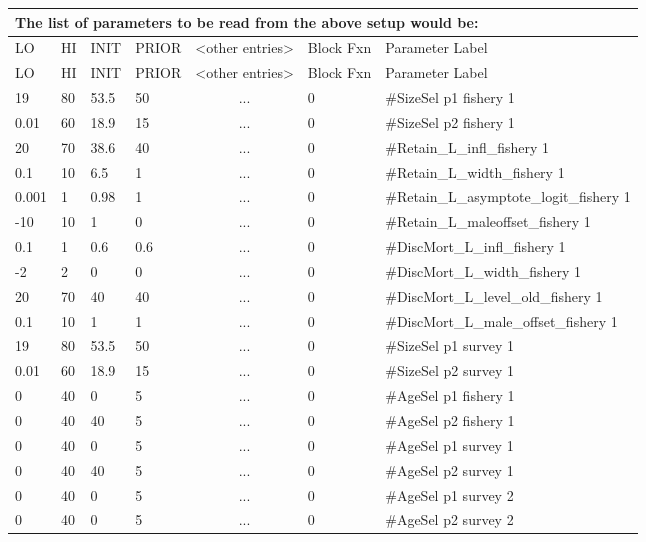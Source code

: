 \begin{longtable}{p{1cm} p{1cm} p{1cm} p{1.5cm} p{2.9cm} p{1.9cm} p{4.2cm}}
	\multicolumn{7}{l}{The list of parameters to be read from the above setup would be:} \\
	\hline
	LO \Tstrut & HI & INIT & PRIOR & <other entries> & Block Fxn & Parameter Label \Bstrut\\
	\hline
	\endfirsthead

	\hline
	LO \Tstrut & HI & INIT & PRIOR & <other entries> & Block Fxn & Parameter Label \Bstrut\\
	\hline
	\endhead
		
	19    & 80   & 53.5 & 50  & \multicolumn{1}{c}{...}  & 0   & \#SizeSel p1 fishery 1 \Tstrut\\
	0.01  & 60   & 18.9 & 15  & \multicolumn{1}{c}{...}  & 0   & \#SizeSel p2 fishery 1 \\
	20    & 70   & 38.6 & 40  & \multicolumn{1}{c}{...}  & 0   & \#Retain\_L\_infl\_fishery 1 \\
	0.1   & 10   & 6.5  & 1   & \multicolumn{1}{c}{...}  & 0   & \#Retain\_L\_width\_fishery 1 \\
	0.001 & 1    & 0.98 & 1   & \multicolumn{1}{c}{...}  & 0   & \#Retain\_L\_asymptote\_logit\_fishery 1 \\
	-10   & 10   & 1    & 0   & \multicolumn{1}{c}{...}  & 0   & \#Retain\_L\_maleoffset\_fishery 1 \\
	0.1   & 1    & 0.6  & 0.6 & \multicolumn{1}{c}{...}  & 0   & \#DiscMort\_L\_infl\_fishery 1 \\
	-2    & 2    & 0    & 0   & \multicolumn{1}{c}{...}  & 0   & \#DiscMort\_L\_width\_fishery 1 \\
	20    & 70   & 40   & 40  & \multicolumn{1}{c}{...}  & 0   & \#DiscMort\_L\_level\_old\_fishery 1 \\
	0.1   & 10   & 1    & 1   & \multicolumn{1}{c}{...}  & 0   & \#DiscMort\_L\_male\_offset\_fishery 1 \\
	19    & 80   & 53.5 & 50  & \multicolumn{1}{c}{...}  & 0   & \#SizeSel p1 survey 1 \\
	0.01  & 60   & 18.9 & 15  & \multicolumn{1}{c}{...}  & 0   & \#SizeSel p2 survey 1 \\
	0     & 40   & 0    & 5   & \multicolumn{1}{c}{...}  & 0   & \#AgeSel p1 fishery 1 \\
	0     & 40   & 40   & 5   & \multicolumn{1}{c}{...}  & 0   & \#AgeSel p2 fishery 1 \\
	0     & 40   & 0    & 5   & \multicolumn{1}{c}{...}  & 0   & \#AgeSel p1 survey 1 \\
	0     & 40   & 40   & 5   & \multicolumn{1}{c}{...}  & 0   & \#AgeSel p2 survey 1 \\
	0     & 40   & 0    & 5   & \multicolumn{1}{c}{...}  & 0   & \#AgeSel p1 survey 2 \\
	0     & 40   & 0    & 5   & \multicolumn{1}{c}{...}  & 0   & \#AgeSel p2 survey 2 \Bstrut\\
	\hline
\end{longtable}


